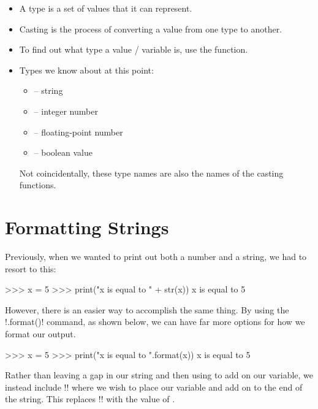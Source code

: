\documentclass[11pt]{cselabheader}
\begin{document}
\begin{itemize}
  \item A type is a set of values that it can represent.
  \item Casting is the process of converting a value from one type to another.
  \item To find out what type a value / variable is, use the
     function.
  \item Types we know about at this point:
    \begin{multicols}{2}
      \begin{itemize}
        \item {} -- string
        \item {} -- integer number
        \item {} -- floating-point number
        \item {} -- boolean value
      \end{itemize}
    \end{multicols}
    Not coincidentally, these type names are also the names of the casting
    functions.
\end{itemize}


\pagebreak
\section{Formatting Strings}

Previously, when we wanted to print out both a number and a string, we
had to resort to this:

\begin{pyconcode}
>>> x = 5
>>> print("x is equal to " + str(x))
x is equal to 5
\end{pyconcode}

However, there is an easier way to accomplish the same thing. By using the
\pythoninline!.format()! command, as shown below, we can have far more options for
how we format our output.

\begin{pyconcode}
>>> x = 5
>>> print("x is equal to {}".format(x))
x is equal to 5
\end{pyconcode}

Rather than leaving a gap in our string and then using \pythoninline{+} to add on
our variable, we instead include \pythoninline!{}! where we wish to place our
variable and add on  to the end of the string. This
replaces \pythoninline!{}! with the value of .
\end{document}
